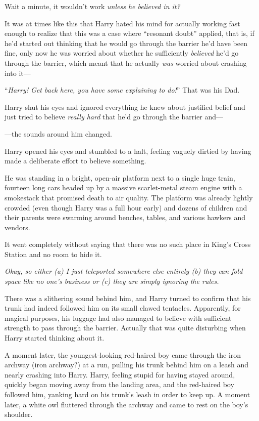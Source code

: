 Wait a minute, it wouldn’t work \emph{unless he believed in it?}

It was at times like this that Harry hated his mind for actually working fast enough to realize that this was a case where “resonant doubt” applied, that is, if he’d started out thinking that he would go through the barrier he’d have been fine, only now he was worried about whether he sufficiently \emph{believed} he’d go through the barrier, which meant that he actually \emph{was} worried about crashing into it—

“\emph{Harry! Get back here, you have some explaining to do!}” That was his Dad.

Harry shut his eyes and ignored everything he knew about justified belief and just tried to believe \emph{really hard} that he’d go through the barrier and—

—the sounds around him changed.

Harry opened his eyes and stumbled to a halt, feeling vaguely dirtied by having made a deliberate effort to believe something.

He was standing in a bright, open-air platform next to a single huge train, fourteen long cars headed up by a massive scarlet-metal steam engine with a smokestack that promised death to air quality. The platform was already lightly crowded (even though Harry was a full hour early) and dozens of children and their parents were swarming around benches, tables, and various hawkers and vendors.

It went completely without saying that there was no such place in King’s Cross Station and no room to hide it.

\emph{Okay, so either (a) I just teleported somewhere else entirely (b) they can fold space like no one’s business or (c) they are simply ignoring the rules.}

There was a slithering sound behind him, and Harry turned to confirm that his trunk had indeed followed him on its small clawed tentacles. Apparently, for magical purposes, his luggage had also managed to believe with sufficient strength to pass through the barrier. Actually that was quite disturbing when Harry started thinking about it.

A moment later, the youngest-looking red-haired boy came through the iron archway (iron archway?) at a run, pulling his trunk behind him on a leash and nearly crashing into Harry. Harry, feeling stupid for having stayed around, quickly began moving away from the landing area, and the red-haired boy followed him, yanking hard on his trunk’s leash in order to keep up. A moment later, a white owl fluttered through the archway and came to rest on the boy’s shoulder.

